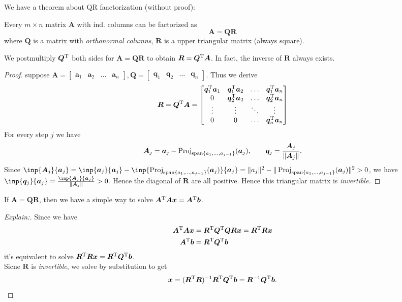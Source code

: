 We have a theorem about QR faactorization (without proof):
\begin{theorem}
Every $m\times n$ matrix $\bm A$ with ind. columns can be factorized as
\[
\bm A=\bm{QR}
\]
where $\bm Q$ is a matrix with \textit{orthonormal columns}, $\bm R$ is a upper triangular matrix (always square).
\end{theorem}
We postmultiply $\bm Q^{\mathrm T}$ both sides for $\bm A=\bm{QR}$ to obtain $\bm R=\bm Q^{\mathrm T}\bm A$. In fact, the inverse of $\bm R$ always exists.
\enlargethispage{1cm}
\begin{proof}
suppose $\bm A=\begin{bmatrix}
\bm a_1&\bm a_2&\dots&\bm a_n
\end{bmatrix}, \bm Q=\begin{bmatrix}
\bm q_1&\bm q_2&\dots&\bm q_n
\end{bmatrix}$.
 Thus we derive \[\bm R=\bm Q^{\mathrm T}\bm A=\begin{bmatrix}
\bm q_1^{\mathrm T}\bm a_1&\bm q_1^{\mathrm T}\bm a_2&\dots&\bm q_1^{\mathrm T}\bm a_n\\
0&\bm q_2^{\mathrm T}\bm a_2&\dots&\bm q_2^{\mathrm T}\bm a_n\\
\vdots&\vdots&\ddots&\vdots\\
0&0&\dots&\bm q_n^{\mathrm T}\bm a_n
\end{bmatrix}
\]
For every step $j$ we have 
\[\bm A_j=\bm a_j-\operatorname{Proj}_{\operatorname{span}\{a_1,\dots,a_{j-1}\}}( \bm a_j),\qquad \bm q_j=\frac{\bm A_j}{\|\bm A_j\|}.
\]
Since $\inp{\bm A_j}{\bm a_j}=\inp{\bm a_j}{\bm a_j}-\inp{\Proj_{\Span\{a_1,\dots,a_{j-1}\}}(\bm a_j)}{\bm a_j}=\|a_j\|^2-\|\Proj_{\Span\{a_1,\dots,a_{j-1}\}}(\bm a_j)\|^2>0$, we have $\inp{\bm q_j}{\bm a_j}=\frac{\inp{\bm A_j}{\bm a_j}}{\|\bm A_j\|}>0.$ Hence the diagonal of $\bm R$ are all positive. Hence this triangular matrix is \textit{invertible.}
\end{proof}
\begin{proposition}
If $\bm A=\bm{QR}$, then we have a simple way to solve $\bm A^{\mathrm T}\bm A\bm x=\bm A^{\mathrm T}\bm b$.
\end{proposition}
\begin{proof}[Explain:]
Since we have
\[
\begin{aligned}
\bm A^{\mathrm T}\bm A\bm x&=\bm R^{\mathrm T}\bm Q^{\mathrm T}\bm Q\bm R\bm x=\bm R^{\mathrm T}\bm R\bm x\\
\bm A^{\mathrm T}\bm b&=\bm R^{\mathrm T}\bm Q^{\mathrm T}\bm b
\end{aligned}
\]
it's equivalent to solve $\bm R^{\mathrm T}\bm R\bm x=\bm R^{\mathrm T}\bm Q^{\mathrm T}\bm b$.\\
Sicne $\bm R$ is \textit{invertible}, we solve by substitution to get
\[
\bm x=(\bm R^{\mathrm T}\bm R)^{-1}\bm R^{\mathrm T}\bm Q^{\mathrm T}\bm b=\bm R^{-1}\bm Q^{\mathrm T}\bm b.
\]
\end{proof}\newpage
